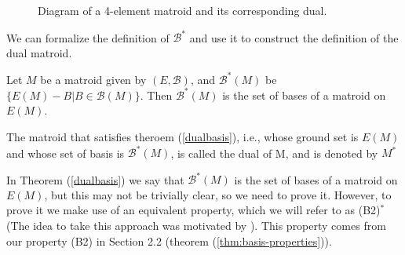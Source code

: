 \begin{figure}[H]

\begin{center}
\end{center}
\caption{Diagram of a 4-element matroid and its corresponding dual.}
\label{DoubleDiagramDual}
\end{figure}



We can formalize the definition of $\mathcal{B}^*$ and use it to construct the definition of the dual matroid.

\begin{theorem}\label{dualbasis}
    Let $M$ be a matroid given by $(E,\mathcal{B})$, and $\mathcal{B}^*(M)$ be $\{E(M) - B|B\in \mathcal{B}(M)\}$. Then $\mathcal{B}^*(M)$ is the set of bases of a matroid on $E(M)$.
\end{theorem}

\begin{defn}
     The matroid that satisfies theroem (\ref{dualbasis}), i.e., whose ground set is $E(M)$ and whose set of basis is $\mathcal{B}^*(M)$, is called the dual of M, and is denoted by $M^*$
\end{defn}

In Theorem (\ref{dualbasis}) we say that $\mathcal{B}^*(M)$ is the set of bases of a matroid on $E(M)$, but this may not be trivially clear, so we need to prove it. However, to prove it we make use of an equivalent property, which we will refer to as (B2)$^*$ (The idea to take this approach was motivated by \cite[p. 64]{oxley1}). This property comes from our property (B2) in Section 2.2 (theorem (\ref{thm:basis-properties})).

